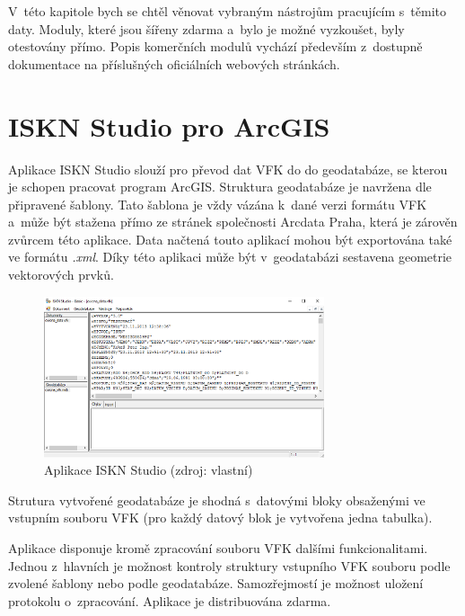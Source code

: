 \documentclass[a4paper,12pt,oneside]{book}
\begin{document}
V~této kapitole bych se chtěl věnovat vybraným nástrojům pracujícím s~těmito daty. Moduly, které jsou šířeny zdarma a~bylo je možné vyzkoušet, byly otestovány přímo. Popis komerčních modulů vychází především z~dostupně dokumentace na příslušných oficiálních webových stránkách.

\section{ISKN Studio pro ArcGIS}
\label{l_iskn_studio}
Aplikace ISKN Studio slouží pro převod dat VFK do do geodatabáze, se kterou je schopen pracovat program ArcGIS. Struktura geodatabáze je navržena dle připravené šablony. Tato šablona je vždy vázána k~dané verzi formátu VFK a~může být stažena přímo ze stránek společnosti Arcdata Praha, která je zárověn zvůrcem této aplikace. Data načtená touto aplikací mohou být exportována také ve formátu \textit{.xml}. Díky této aplikaci může být v~geodatabázi sestavena geometrie vektorových prvků. \cite{iskn_studio}

\begin{figure}[htb]
\centering
\includegraphics[width=\textwidth]{images/ISKNStudio-aplikace.png}
\caption[Aplikace ISKN Studio]{Aplikace ISKN Studio (zdroj: vlastní)}
\end{figure}

Strutura vytvořené geodatabáze je shodná s~datovými bloky obsaženými ve vstupním souboru VFK (pro každý datový blok je vytvořena jedna tabulka). 

Aplikace disponuje kromě zpracování souboru VFK dalšími funkcionalitami. Jednou z~hlavních je možnost kontroly struktury vstupního VFK souboru podle zvolené šablony nebo podle geodatabáze. Samozřejmostí je možnost uložení protokolu o~zpracování. Aplikace je distribuována zdarma.
\end{document}

